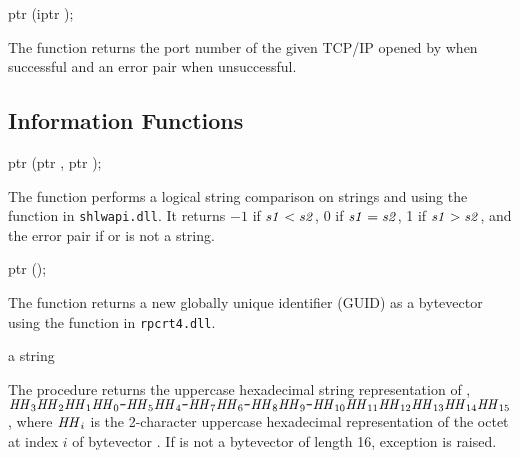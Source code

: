 \begin{function}
  ptr (iptr );
\end{function}\antipar

The  function returns the port
number of the given TCP/IP  opened by
 when successful and an error pair when
unsuccessful.

\subsection {Information Functions}

\begin{function}
  ptr (ptr , ptr );
\end{function}\antipar

The  function performs a logical
string comparison on strings  and  using the
 function in \texttt{shlwapi.dll}.  It returns
$-1$ if $\var{s1} < \var{s2}$, 0 if $\var{s1} = \var{s2}$, 1 if
$\var{s1} > \var{s2}$, and the error pair
if  or  is not a string.

\begin{function}
  ptr ();
\end{function}\antipar

The  function returns a new globally unique
identifier (GUID) as a bytevector using the 
function in \texttt{rpcrt4.dll}.

\begin{procedure}
\end{procedure}
\returns{} a string

The  procedure returns the uppercase hexadecimal
string representation of ,
$\var{HH}_3\var{HH}_2\var{HH}_1\var{HH}_0\code{-}\var{HH}_5\var{HH}_4\code{-}\var{HH}_7\var{HH}_6\code{-}\var{HH}_8\var{HH}_9\code{-}\var{HH}_{10}\var{HH}_{11}\var{HH}_{12}\var{HH}_{13}\var{HH}_{14}\var{HH}_{15}$,
where $\var{HH}_i$ is the 2-character uppercase hexadecimal
representation of the octet at index $i$ of bytevector .  If
 is not a bytevector of length 16, exception
 is raised.

